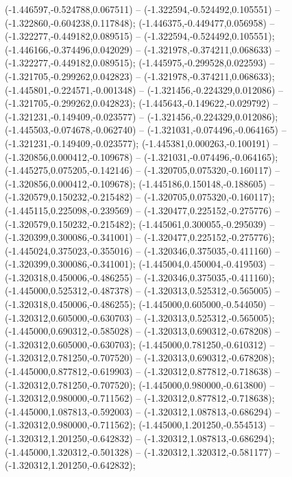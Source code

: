  (-1.446597,-0.524788,0.067511) -- (-1.322594,-0.524492,0.105551) -- (-1.322860,-0.604238,0.117848);
 (-1.446375,-0.449477,0.056958) -- (-1.322277,-0.449182,0.089515) -- (-1.322594,-0.524492,0.105551);
 (-1.446166,-0.374496,0.042029) -- (-1.321978,-0.374211,0.068633) -- (-1.322277,-0.449182,0.089515);
 (-1.445975,-0.299528,0.022593) -- (-1.321705,-0.299262,0.042823) -- (-1.321978,-0.374211,0.068633);
 (-1.445801,-0.224571,-0.001348) -- (-1.321456,-0.224329,0.012086) -- (-1.321705,-0.299262,0.042823);
 (-1.445643,-0.149622,-0.029792) -- (-1.321231,-0.149409,-0.023577) -- (-1.321456,-0.224329,0.012086);
 (-1.445503,-0.074678,-0.062740) -- (-1.321031,-0.074496,-0.064165) -- (-1.321231,-0.149409,-0.023577);
 (-1.445381,0.000263,-0.100191) -- (-1.320856,0.000412,-0.109678) -- (-1.321031,-0.074496,-0.064165);
 (-1.445275,0.075205,-0.142146) -- (-1.320705,0.075320,-0.160117) -- (-1.320856,0.000412,-0.109678);
 (-1.445186,0.150148,-0.188605) -- (-1.320579,0.150232,-0.215482) -- (-1.320705,0.075320,-0.160117);
 (-1.445115,0.225098,-0.239569) -- (-1.320477,0.225152,-0.275776) -- (-1.320579,0.150232,-0.215482);
 (-1.445061,0.300055,-0.295039) -- (-1.320399,0.300086,-0.341001) -- (-1.320477,0.225152,-0.275776);
 (-1.445024,0.375023,-0.355016) -- (-1.320346,0.375035,-0.411160) -- (-1.320399,0.300086,-0.341001);
 (-1.445004,0.450004,-0.419503) -- (-1.320318,0.450006,-0.486255) -- (-1.320346,0.375035,-0.411160);
 (-1.445000,0.525312,-0.487378) -- (-1.320313,0.525312,-0.565005) -- (-1.320318,0.450006,-0.486255);
 (-1.445000,0.605000,-0.544050) -- (-1.320312,0.605000,-0.630703) -- (-1.320313,0.525312,-0.565005);
 (-1.445000,0.690312,-0.585028) -- (-1.320313,0.690312,-0.678208) -- (-1.320312,0.605000,-0.630703);
 (-1.445000,0.781250,-0.610312) -- (-1.320312,0.781250,-0.707520) -- (-1.320313,0.690312,-0.678208);
 (-1.445000,0.877812,-0.619903) -- (-1.320312,0.877812,-0.718638) -- (-1.320312,0.781250,-0.707520);
 (-1.445000,0.980000,-0.613800) -- (-1.320312,0.980000,-0.711562) -- (-1.320312,0.877812,-0.718638);
 (-1.445000,1.087813,-0.592003) -- (-1.320312,1.087813,-0.686294) -- (-1.320312,0.980000,-0.711562);
 (-1.445000,1.201250,-0.554513) -- (-1.320312,1.201250,-0.642832) -- (-1.320312,1.087813,-0.686294);
 (-1.445000,1.320312,-0.501328) -- (-1.320312,1.320312,-0.581177) -- (-1.320312,1.201250,-0.642832);
